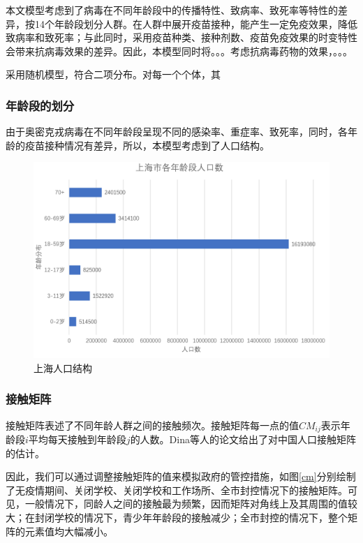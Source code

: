 \documentclass[bwprint]{gmcmthesis}
\numberwithin{figure}{section}
\begin{document}
\par 本文模型考虑到了病毒在不同年龄段中的传播特性、致病率、致死率等特性的差异，按14个年龄段划分人群。在人群中展开疫苗接种，能产生一定免疫效果，降低致病率和致死率；与此同时，采用疫苗种类、接种剂数、疫苗免疫效果的时变特性会带来抗病毒效果的差异。因此，本模型同时将。。。考虑抗病毒药物的效果，。。。
\par 采用随机模型，符合二项分布。对每一个个体，其
\subsubsection{年龄段的划分}
由于奥密克戎病毒在不同年龄段呈现不同的感染率、重症率、致死率，同时，各年龄的疫苗接种情况有差异，所以，本模型考虑到了人口结构。
\begin{figure}[!h]
\centering
\includegraphics[width=.75\textwidth]{renkou.png}
\caption{上海人口结构}
\label{renkou}
\end{figure}

\subsubsection{接触矩阵}
接触矩阵表述了不同年龄人群之间的接触频次。接触矩阵每一点的值$CM_{ij}$表示年龄段$i$平均每天接触到年龄段$j$的人数。Dina等人的论文\cite{}给出了对中国人口接触矩阵的估计。

\par 因此，我们可以通过调整接触矩阵的值来模拟政府的管控措施，如图\ref{cm}分别绘制了无疫情期间、关闭学校、关闭学校和工作场所、全市封控情况下的接触矩阵。可见，一般情况下，同龄人之间的接触最为频繁，因而矩阵对角线上及其周围的值较大；在封闭学校的情况下，青少年年龄段的接触减少；全市封控的情况下，整个矩阵的元素值均大幅减小。
\end{document}
